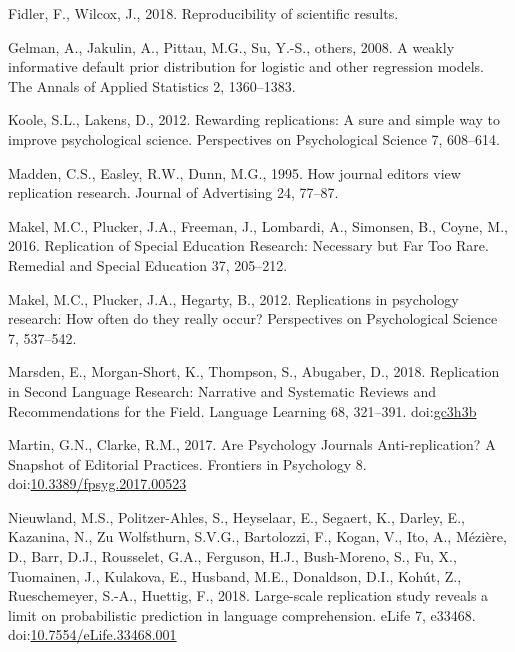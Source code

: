 \documentclass[]{elsarticle} %
\newlength{\cslhangindent}
\newlength{\cslentryspacingunit} %
\newenvironment{CSLReferences}[2] %
 {%
  \setlength{\parindent}{0pt}
  \ifodd #1
  \let\oldpar\par
  \def\par{\hangindent=\cslhangindent\oldpar}
  \fi
  \setlength{\parskip}{#2\cslentryspacingunit}
 }%
 {}
\begin{document}
\begin{CSLReferences}{1}{0}
\leavevmode{}%
Fidler, F., Wilcox, J., 2018. Reproducibility of scientific results.

\leavevmode{}%
Gelman, A., Jakulin, A., Pittau, M.G., Su, Y.-S., others, 2008. A weakly
informative default prior distribution for logistic and other regression
models. The Annals of Applied Statistics 2, 1360--1383.

\leavevmode{}%
Koole, S.L., Lakens, D., 2012. Rewarding replications: {A} sure and
simple way to improve psychological science. Perspectives on
Psychological Science 7, 608--614.

\leavevmode{}%
Madden, C.S., Easley, R.W., Dunn, M.G., 1995. How journal editors view
replication research. Journal of Advertising 24, 77--87.

\leavevmode{}%
Makel, M.C., Plucker, J.A., Freeman, J., Lombardi, A., Simonsen, B.,
Coyne, M., 2016. Replication of {Special} {Education} {Research}:
{Necessary} but {Far} {Too} {Rare}. Remedial and Special Education 37,
205--212.

\leavevmode{}%
Makel, M.C., Plucker, J.A., Hegarty, B., 2012. Replications in
psychology research: {How} often do they really occur? Perspectives on
Psychological Science 7, 537--542.

\leavevmode{}%
Marsden, E., Morgan‐Short, K., Thompson, S., Abugaber, D., 2018.
Replication in {Second} {Language} {Research}: {Narrative} and
{Systematic} {Reviews} and {Recommendations} for the {Field}. Language
Learning 68, 321--391. doi:\href{https://doi.org/gc3h3b}{gc3h3b}

\leavevmode{}%
Martin, G.N., Clarke, R.M., 2017. Are {Psychology} {Journals}
{Anti}-replication? {A} {Snapshot} of {Editorial} {Practices}. Frontiers
in Psychology 8.
doi:\href{https://doi.org/10.3389/fpsyg.2017.00523}{10.3389/fpsyg.2017.00523}

\leavevmode{}%
Nieuwland, M.S., Politzer-Ahles, S., Heyselaar, E., Segaert, K., Darley,
E., Kazanina, N., Zu Wolfsthurn, S.V.G., Bartolozzi, F., Kogan, V., Ito,
A., Mézière, D., Barr, D.J., Rousselet, G.A., Ferguson, H.J.,
Bush-Moreno, S., Fu, X., Tuomainen, J., Kulakova, E., Husband, M.E.,
Donaldson, D.I., Kohút, Z., Rueschemeyer, S.-A., Huettig, F., 2018.
Large-scale replication study reveals a limit on probabilistic
prediction in language comprehension. eLife 7, e33468.
doi:\href{https://doi.org/10.7554/eLife.33468.001}{10.7554/eLife.33468.001}


\end{CSLReferences}
\end{document}
